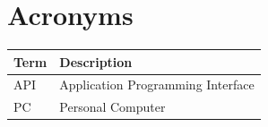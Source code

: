 \documentclass[english,paper=a4,captions=tableheading]{scrartcl}
\begin{document}
\hypertarget{acronyms}{%
\section{Acronyms}\label{acronyms}}

\begin{small}
  \begin{longtable}[]{|
    >{\raggedright\arraybackslash}p{}|
    >{\raggedright\arraybackslash}p{}|}
  \hline
\textbf{Term} & \textbf{Description} \\
\hline
API & Application Programming Interface \\
\hline
PC & Personal Computer \\
\hline
\end{longtable}
\end{small}
\end{document}

